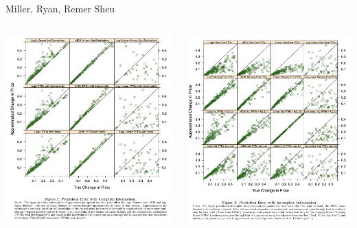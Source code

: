 \begin{frame}{Miller, Ryan, Remer Sheu}
\begin{columns}
\begin{column}{0.5\textwidth}
\includegraphics[width=\textwidth]{resources/mrss_complete}
\end{column}
\begin{column}{0.5\textwidth}
\includegraphics[width=\textwidth]{resources/mrss_incomplete}
\end{column}
\end{columns}
\end{frame}


